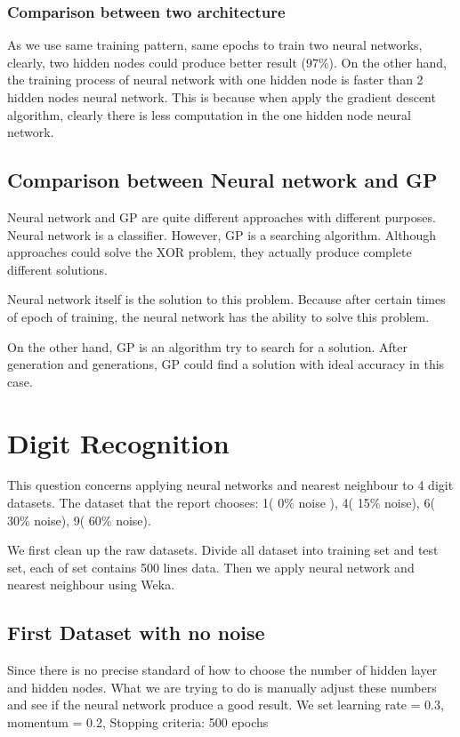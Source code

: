 \documentclass[11pt, a4paper, oneside, openright]{article}
\begin{document}
\subsubsection{Comparison between two architecture}
As we use same training pattern, same epochs to train two neural networks, clearly, two hidden nodes could produce better result (97\%). On the other hand, the training process of neural network with one hidden node is faster than 2 hidden nodes neural network. This is because when apply the gradient descent algorithm, clearly there is less computation in the one hidden node neural network.


\subsection{Comparison between Neural network and GP}
Neural network and GP are quite different approaches with different purposes. Neural network is a classifier. However, GP is a searching algorithm. Although approaches could solve the XOR problem, they actually produce complete different solutions. 

Neural network itself is the solution to this problem. Because after certain times of epoch of training, the neural network has the ability to solve this problem.

On the other hand, GP is an algorithm try to search for a solution. After generation and generations, GP could find a solution with ideal accuracy in this case.


\section{Digit Recognition}
This question concerns applying neural networks and nearest neighbour to 4 digit datasets. The dataset that the report chooses: 1( 0\% noise ), 4( 15\% noise), 6( 30\% noise), 9( 60\% noise).

We first clean up the raw datasets. Divide all dataset into training set and test set, each  of set contains 500 lines data.
Then we apply neural network and nearest neighbour using Weka\cite{Hall:2009:WDM:1656274.1656278}.
\subsection{First Dataset with no noise}
Since there is no precise standard of how to choose the number of hidden layer and hidden nodes. What we are trying to do is manually adjust these numbers and see if the neural network produce a good result. We set learning rate = 0.3, momentum = 0.2, Stopping criteria: 500 epochs
\end{document}
